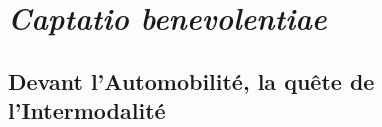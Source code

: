 
\cleardoublepage
\section*{\textsl{Captatio benevolentiae}
    \label{body:mt180}
    }

\subsection*{Devant l'Automobilité, la quête de l'Intermodalité}
    
